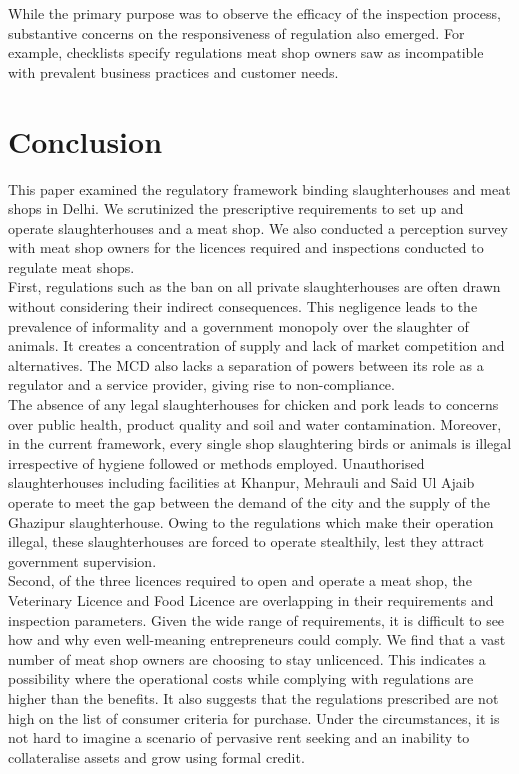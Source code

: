 \documentclass[a4paper, 12pt]{article}
\begin{document}
While the primary purpose was to observe the efficacy of the inspection process, substantive concerns on the responsiveness of regulation also emerged. For example, checklists specify regulations meat shop owners saw as incompatible with prevalent business practices and customer needs. 

\section{Conclusion}

This paper examined the regulatory framework binding slaughterhouses and meat shops in Delhi. We scrutinized the prescriptive requirements to set up and operate slaughterhouses and a meat shop. We also conducted a perception survey with meat shop owners for the licences required and inspections conducted to regulate meat shops.\\ 

First, regulations such as the ban on all private slaughterhouses are often drawn without considering their indirect consequences. This negligence leads to the prevalence of informality and a government monopoly over the slaughter of animals. It creates a concentration of supply and lack of market competition and alternatives. The MCD also lacks a separation of powers between its role as a regulator and a service provider, giving rise to non-compliance.\\

The absence of any legal slaughterhouses for chicken and pork leads to concerns over public health, product quality and soil and water contamination. Moreover, in the current framework, every single shop slaughtering birds or animals is illegal irrespective of hygiene followed or methods employed. Unauthorised slaughterhouses including facilities at Khanpur, Mehrauli and Said Ul Ajaib operate to meet the gap between the demand of the city and the supply of the Ghazipur slaughterhouse. Owing to the regulations which make their operation illegal, these slaughterhouses are forced to operate stealthily, lest they attract government supervision. \\

Second, of the three licences required to open and operate a meat shop, the Veterinary Licence and Food Licence are overlapping in their requirements and inspection parameters. Given the wide range of requirements, it is difficult to see how and why even well-meaning entrepreneurs could comply. We find that a vast number of meat shop owners are choosing to stay unlicenced. This indicates a possibility where the operational costs while complying with regulations are higher than the benefits. It also suggests that the regulations prescribed are not high on the list of consumer criteria for purchase. Under the circumstances, it is not hard to imagine a scenario of pervasive rent seeking and an inability to collateralise assets and grow using formal credit. \\
\end{document}
